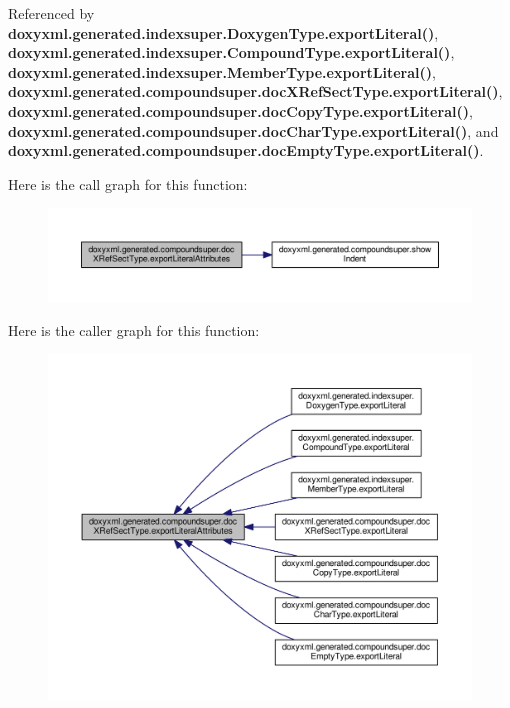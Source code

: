 Referenced by {\bf doxyxml.\+generated.\+indexsuper.\+Doxygen\+Type.\+export\+Literal()}, {\bf doxyxml.\+generated.\+indexsuper.\+Compound\+Type.\+export\+Literal()}, {\bf doxyxml.\+generated.\+indexsuper.\+Member\+Type.\+export\+Literal()}, {\bf doxyxml.\+generated.\+compoundsuper.\+doc\+X\+Ref\+Sect\+Type.\+export\+Literal()}, {\bf doxyxml.\+generated.\+compoundsuper.\+doc\+Copy\+Type.\+export\+Literal()}, {\bf doxyxml.\+generated.\+compoundsuper.\+doc\+Char\+Type.\+export\+Literal()}, and {\bf doxyxml.\+generated.\+compoundsuper.\+doc\+Empty\+Type.\+export\+Literal()}.



Here is the call graph for this function\+:
\nopagebreak
\begin{figure}[H]
\begin{center}
\leavevmode
\includegraphics[width=350pt]{d3/d61/classdoxyxml_1_1generated_1_1compoundsuper_1_1docXRefSectType_ac587d9f1ce2e3fededafb0c23f10ed5d_cgraph}
\end{center}
\end{figure}




Here is the caller graph for this function\+:
\nopagebreak
\begin{figure}[H]
\begin{center}
\leavevmode
\includegraphics[width=350pt]{d3/d61/classdoxyxml_1_1generated_1_1compoundsuper_1_1docXRefSectType_ac587d9f1ce2e3fededafb0c23f10ed5d_icgraph}
\end{center}
\end{figure}


